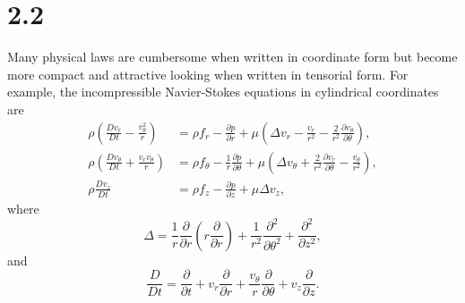 \section{2.2}
\label{sec:2.2}


\begin{rem}
  Many physical laws are cumbersome
  when written in coordinate form
  but become more compact and attractive looking
  when written in tensorial form.
  For example,
  the incompressible Navier-Stokes equations in cylindrical coordinates are
  \begin{align*}
    \rho\left(\frac{Dv_r}{Dt}-\frac{v_{\theta}^2}{r}\right) &= \rho f_r-\frac{\partial p}{\partial r} + \mu\left(\Delta v_r-\frac{v_r}{r^2}-\frac{2}{r^2}\frac{\partial v_{\theta}}{\partial \theta}\right), \\
    \rho\left(\frac{Dv_{\theta}}{Dt}+\frac{v_rv_{\theta}}{r}\right) &= \rho f_{\theta}-\frac{1}{r}\frac{\partial p}{\partial\theta} + \mu\left(\Delta v_{\theta}+\frac{2}{r^2}\frac{\partial v_r}{\partial\theta}-\frac{v_{\theta}}{r^2}\right), \\
    \rho \frac{Dv_z}{Dt} &= \rho f_z-\frac{\partial p}{\partial z}+\mu\Delta v_z,
  \end{align*}
  where
  \begin{equation*}
    \Delta = \frac{1}{r}\frac{\partial}{\partial r}\left(r \frac{\partial}{\partial r}\right)+\frac{1}{r^2}\frac{\partial^2}{\partial \theta^2}+\frac{\partial^2}{\partial z^2},
  \end{equation*}
  and
  \begin{equation*}
    \frac{D}{Dt} = \frac{\partial}{\partial t}+v_r \frac{\partial}{\partial r}+\frac{v_{\theta}}{r}\frac{\partial}{\partial\theta}+v_z \frac{\partial}{\partial z}.
  \end{equation*}
\end{rem}

